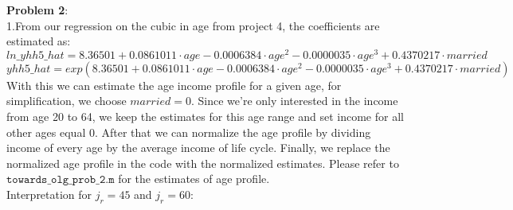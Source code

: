 \documentclass[12pt,a4paper]{article}
\begin{document}
\textbf{Problem 2}:\\
1.From our regression on the cubic in age from project 4, the coefficients are estimated as:
\begin{equation*}
    ln\_yhh5\_hat=8.36501+0.0861011\cdot age-0.0006384 \cdot age^2-0.0000035\cdot age^3+0.4370217\cdot married   
\end{equation*}
\begin{equation*}
    yhh5\_hat=exp(8.36501+0.0861011\cdot age-0.0006384 \cdot age^2-0.0000035\cdot age^3+0.4370217\cdot married)  
\end{equation*}
With this we can estimate the age income profile for a given age, for simplification, we choose $married=0$. Since we're only interested in the income from age 20 to 64, we keep the estimates for this age range and set income for all other ages equal 0. After that we can normalize the age profile by dividing income of every age by the average income of life cycle. Finally, we replace the normalized age profile in the code with the normalized estimates. Please refer to $\texttt{towards\_olg\_prob\_2.m}$ for the estimates of age profile. \\

Interpretation for $j_r=45$ and $j_r=60$:

\\
\end{document}
